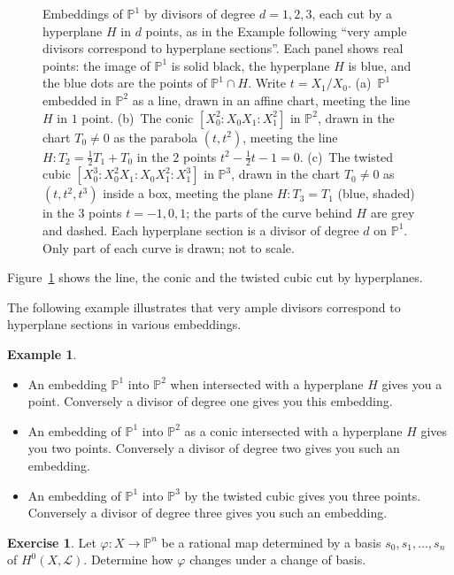 \documentclass[12pt]{article}
\numberwithin{equation}{section}
\theoremstyle{definition}
\newtheorem{example}[theorem]{Example}
\newtheorem{exercise}[theorem]{Exercise}
\theoremstyle{remark}
\newcommand{\PP}{\mathbb{P}}
\newcommand{\Lcal}{\mathcal{L}}
\begin{document}
\begin{figure}[H]
\centering

\caption{Embeddings of $\PP^1$ by divisors of degree $d=1,2,3$, each cut by a hyperplane $H$ in $d$ points, as in the Example following ``very ample divisors correspond to hyperplane sections''. Each panel shows real points: the image of $\PP^1$ is solid black, the hyperplane $H$ is blue, and the blue dots are the points of $\PP^1\cap H$. Write $t=X_1/X_0$. (a)~$\PP^1$ embedded in $\PP^2$ as a line, drawn in an affine chart, meeting the line $H$ in $1$ point. (b)~The conic $[X_0^2{:}X_0X_1{:}X_1^2]$ in $\PP^2$, drawn in the chart $T_0\neq0$ as the parabola $(t,t^2)$, meeting the line $H\colon T_2=\tfrac12T_1+T_0$ in the $2$ points $t^2-\tfrac12t-1=0$. (c)~The twisted cubic $[X_0^3{:}X_0^2X_1{:}X_0X_1^2{:}X_1^3]$ in $\PP^3$, drawn in the chart $T_0\neq0$ as $(t,t^2,t^3)$ inside a box, meeting the plane $H\colon T_3=T_1$ (blue, shaded) in the $3$ points $t=-1,0,1$; the parts of the curve behind $H$ are grey and dashed. Each hyperplane section is a divisor of degree $d$ on $\PP^1$. Only part of each curve is drawn; not to scale.}\label{fig:hyperplane-sections-p1}
\end{figure}
Figure~\ref{fig:hyperplane-sections-p1} shows the line, the conic and the twisted cubic cut by hyperplanes.

The following example illustrates that very ample divisors correspond to hyperplane sections in various embeddings. 
\begin{example}
	\begin{itemize}
		\item An embedding $\PP^1$ into $\PP^2$ when intersected with a hyperplane $H$ gives you a point. Conversely a divisor of degree one gives you this embedding. 
		\item An embedding of $\PP^1$ into $\PP^2$ as a conic intersected with a hyperplane $H$ gives you two points. Conversely a divisor of degree two gives you such an embedding. 
		\item An embedding of $\PP^1$ into $\PP^3$ by the twisted cubic gives you three points. Conversely a divisor of degree three gives you such an embedding.
	\end{itemize}
\end{example}

\begin{exercise}
	Let $\varphi: X \to \PP^n$ be a rational map determined by a basis $s_0,s_1,\ldots,s_n$ of $H^0(X,\Lcal)$. 
	Determine how $\varphi$ changes under a change of basis.
\end{exercise}
\end{document}
